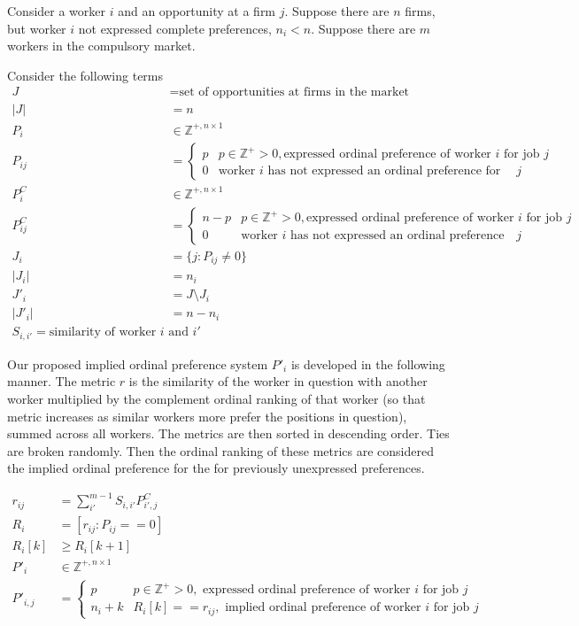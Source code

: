 Consider a worker $i$ and an opportunity at a firm $j$. Suppose there are $n$ firms, but worker $i$ not expressed complete preferences, $n_i < n$. Suppose there are $m$ workers in the compulsory market.

Consider the following terms 
\begin{align*}
J &= \text{set of opportunities at firms in the market} \\
|J| &= n \\
P_i & \in \mathbb{Z}^{+, n \times 1} \\
P_{ij} &= \begin{cases}
p & p \in \mathbb{Z}^+ > 0, \text{expressed ordinal preference of worker $i$ for job $j$}\\
0 & \text{worker $i$ has not expressed an ordinal preference for job $j$}
\end{cases} \\
P^C_i & \in \mathbb{Z}^{+, n \times 1} \\
P^C_{ij} &= \begin{cases}
n-p & p \in \mathbb{Z}^+ > 0, \text{expressed ordinal preference of worker $i$ for job $j$}\\
0 & \text{worker $i$ has not expressed an ordinal preference for job $j$}
\end{cases} \\
J_i &= \{j : P_{ij} \neq 0\} \\
|J_i| &= n_i \\
J'_i &= J \setminus J_i \\
|J'_i| &= n - n_i \\
S_{i, i'} = \text{similarity of worker $i$ and $i'$}
\end{align*}

Our proposed implied ordinal preference system $P'_i$ is developed in the following manner. The metric $r$ is the similarity of the worker in question with another worker multiplied by the complement ordinal ranking of that worker (so that metric increases as similar workers more prefer the positions in question), summed across all workers. The metrics are then sorted in descending order. Ties are broken randomly. Then the ordinal ranking of these metrics are considered the implied ordinal preference for the for previously unexpressed preferences.

\begin{align*}
r_{ij} &= \sum_{i'}^{m-1}S_{i,i'} P^C_{i',j} \\
R_i &= [r_{ij}: P_{ij} == 0] \\
R_i[k] & \geq R_i[k+1] \\
P'_i & \in \mathbb{Z}^{+, n \times 1} \\
P'_{i,j} &= \begin{cases}
p & p \in \mathbb{Z}^+ > 0, \text{ expressed ordinal preference of worker $i$ for job $j$}\\
n_i + k & R_i[k] == r_{ij}, \text{ implied ordinal preference of worker $i$ for job $j$}
\end{cases} \\
\end{align*}